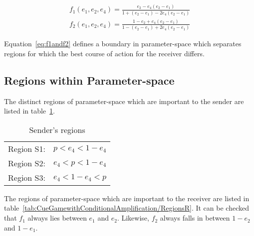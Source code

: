 \documentclass[a4paper,12pt]{article}
\numberwithin{equation}{section}
\begin{document}
\begin{subequations}
\label{eq:f1andf2}
\begin{gather}
f_{1}(e_{1},e_{2},e_{4})=\frac{e_{2}-e_{4}(e_{2}-e_{1})}{1+(e_{2}-e_{1})-2 e_{4}(e_{2}-e_{1})}\\
f_{2}(e_{1},e_{2},e_{4})=\frac{1-e_{2}+e_{4}(e_{2}-e_{1})}{1-(e_{2}-e_{1})+2 e_{4}(e_{2}-e_{1})}
\end{gather}
\end{subequations}

Equation~\ref{eq:f1andf2} defines a boundary in parameter-space which separates regions for which the best course of action for the receiver differs.


\subsection{Regions within Parameter-space}
\label{sec:Cue Game with Conditional Amplification/Regions}

The distinct regions of parameter-space which are important to the sender are listed in table~\ref{tab:CueGamewithConditionalAmplification/RegionsS}.

\begin{table}[h]
\begin{center}
\begin{tabular}{lc}
Region S1: & $p<e_{4}<1-e_{4}$\\
Region S2: & $e_{4}<p<1-e_{4}$\\
Region S3: & $e_{4}<1-e_{4}<p$
\end{tabular}
\end{center}
\caption{Sender's regions}
\label{tab:CueGamewithConditionalAmplification/RegionsS}
\end{table}

The regions of parameter-space which are important to the receiver are listed in table~\ref{tab:CueGamewithConditionalAmplification/RegionsR}. It can be checked that $f_{1}$ always lies between $e_{1}$ and $e_{2}$. Likewise, $f_{2}$ always falls in between $1-e_{2}$ and $1-e_{1}$.
\end{document}
